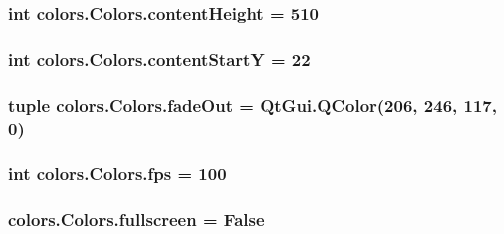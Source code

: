 \subsubsection[{content\+Height}]{\setlength{\rightskip}{0pt plus 5cm}int colors.\+Colors.\+content\+Height = 510\hspace{0.3cm}{\ttfamily [static]}}\label{classcolors_1_1Colors_a9663c9e60e3cfc48f749a9b436fde2f4}
\hypertarget{classcolors_1_1Colors_a5fa80e863994db4328a3a8fe04a6852f}{}
\subsubsection[{content\+Start\+Y}]{\setlength{\rightskip}{0pt plus 5cm}int colors.\+Colors.\+content\+Start\+Y = 22\hspace{0.3cm}{\ttfamily [static]}}\label{classcolors_1_1Colors_a5fa80e863994db4328a3a8fe04a6852f}
\hypertarget{classcolors_1_1Colors_a39cdbb57c7def8b97bcfdcb2d2f4f664}{}
\subsubsection[{fade\+Out}]{\setlength{\rightskip}{0pt plus 5cm}tuple colors.\+Colors.\+fade\+Out = Qt\+Gui.\+Q\+Color(206, 246, 117, 0)\hspace{0.3cm}{\ttfamily [static]}}\label{classcolors_1_1Colors_a39cdbb57c7def8b97bcfdcb2d2f4f664}
\hypertarget{classcolors_1_1Colors_ab7eef988fa9c6b454c98a677d3d0e567}{}
\subsubsection[{fps}]{\setlength{\rightskip}{0pt plus 5cm}int colors.\+Colors.\+fps = 100\hspace{0.3cm}{\ttfamily [static]}}\label{classcolors_1_1Colors_ab7eef988fa9c6b454c98a677d3d0e567}
\hypertarget{classcolors_1_1Colors_a33c6732666ab3ae4f95fe4ffb794b68b}{}
\subsubsection[{fullscreen}]{\setlength{\rightskip}{0pt plus 5cm}colors.\+Colors.\+fullscreen = {\bf False}\hspace{0.3cm}{\ttfamily [static]}}\label{classcolors_1_1Colors_a33c6732666ab3ae4f95fe4ffb794b68b}
\hypertarget{classcolors_1_1Colors_abc0a79de7eb4e2423c5faa6fbd602888}{}
